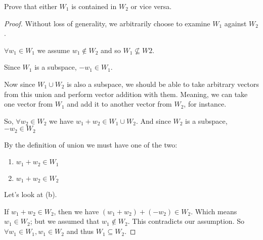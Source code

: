 \documentclass[12pt,letterpaper]{article}
\begin{document}
\begin{enumerate}
      Prove that either $W_1$ is contained in $W_2$ or vice versa.

      \begin{proof}
        Without loss of generality, we arbitrarily choose to examine $W_1$ against $W_2$.

        $\forall w_1 \in W_1$ we assume $w_1 \notin W_2$ and so $W_1 \not\subseteq W2$.

        Since $W_1$ is a subspace, $-w_1 \in W_1$.

        Now since $W_1 \cup W_2$ is also a subspace, we should be able to take arbitrary vectors from this union and perform vector addition with them.
        Meaning, we can take one vector from $W_1$ and add it to another vector from $W_2$, for instance.

        So, $\forall w_2 \in W_2$ we have $w_1 + w_2 \in W_1 \cup W_2$.
        And since $W_2$ is a subspace, $-w_2 \in W_2$

        By the definition of union we must have one of the two:
        \begin{enumerate}
          \item $w_1 + w_2 \in W_1$
          \item $w_1 + w_2 \in W_2$
        \end{enumerate}

        Let's look at (b).

        If $w_1 + w_2 \in W_2$, then we have $(w_1 + w_2) + (-w_2) \in W_2$.
        Which means $w_1 \in W_2$; but we assumed that $w_1 \notin W_2$.
        This contradicts our assumption.
        So $\forall w_1 \in W_1, w_1 \in W_2$ and thus $W_1 \subseteq W_2$.
      \end{proof}
  \end{enumerate}
\end{document}
